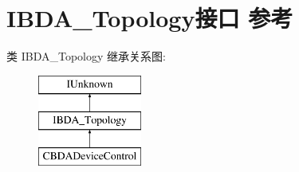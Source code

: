 \hypertarget{interface_i_b_d_a___topology}{}\section{I\+B\+D\+A\+\_\+\+Topology接口 参考}
\label{interface_i_b_d_a___topology}
类 I\+B\+D\+A\+\_\+\+Topology 继承关系图\+:\begin{figure}[H]
\begin{center}
\leavevmode
\includegraphics[height=3.000000cm]{interface_i_b_d_a___topology}
\end{center}
\end{figure}
